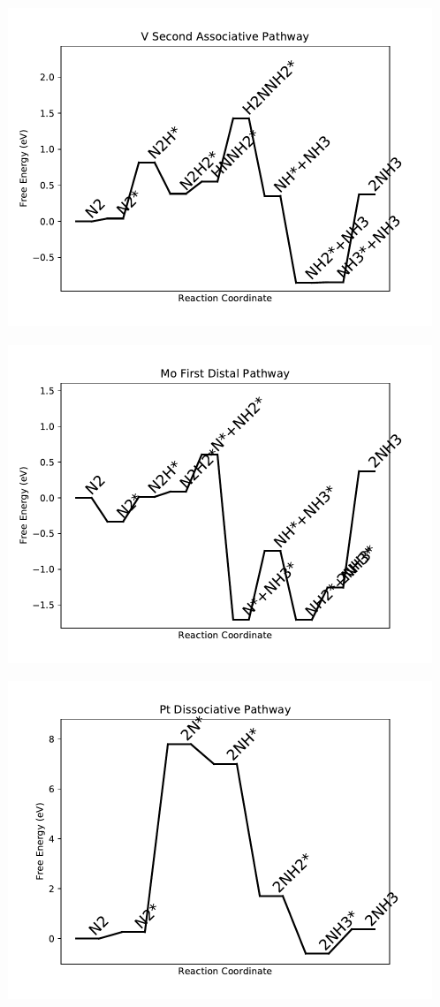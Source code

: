 \begin{figure}
\centering
\includegraphics[width=0.8\linewidth]{data/plots/V_associative_2.pdf}
\end{figure}

\begin{figure}
\centering
\includegraphics[width=0.8\linewidth]{data/plots/Mo_distal_1.pdf}
\end{figure}

\begin{figure}
\centering
\includegraphics[width=0.8\linewidth]{data/plots/Pt_dissociative.pdf}
\end{figure}

